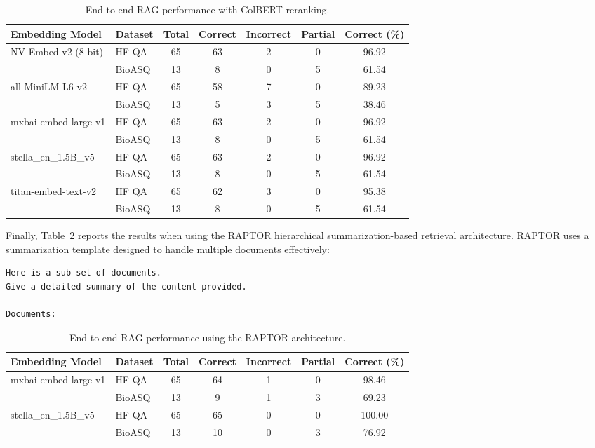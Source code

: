 \documentclass[pdflatex,sn-mathphys-num]{sn-jnl}%
\theoremstyle{thmstyleone}%
\theoremstyle{thmstyletwo}%
\theoremstyle{thmstylethree}%
\begin{document}
\begin{table}[h]
\centering
\small
\begin{tabular}{l l c c c c c}
\hline
\textbf{Embedding Model} & \textbf{Dataset} & \textbf{Total} & \textbf{Correct} & \textbf{Incorrect} & \textbf{Partial} & \textbf{Correct (\%)} \\
\hline
\multirow{2}{*}{NV-Embed-v2 (8-bit)} 
 & HF QA  & 65 & 63 & 2 & 0 & 96.92 \\
 & BioASQ & 13 & 8  & 0 & 5 & 61.54 \\
\hline
\multirow{2}{*}{all-MiniLM-L6-v2} 
 & HF QA  & 65 & 58 & 7 & 0 & 89.23 \\
 & BioASQ & 13 & 5  & 3 & 5 & 38.46 \\
\hline
\multirow{2}{*}{mxbai-embed-large-v1} 
 & HF QA  & 65 & 63 & 2 & 0 & 96.92 \\
 & BioASQ & 13 & 8  & 0 & 5 & 61.54 \\
\hline
\multirow{2}{*}{stella\_en\_1.5B\_v5} 
 & HF QA  & 65 & 63 & 2 & 0 & 96.92 \\
 & BioASQ & 13 & 8  & 0 & 5 & 61.54 \\
\hline
\multirow{2}{*}{titan-embed-text-v2} 
 & HF QA  & 65 & 62 & 3 & 0 & 95.38 \\
 & BioASQ & 13 & 8  & 0 & 5 & 61.54 \\
\hline
\end{tabular}
\caption{End-to-end RAG performance with ColBERT reranking.}
\label{table:rag_eval_rerank}
\end{table}

Finally, Table~\ref{table:rag_eval_raptor} reports the results when using the RAPTOR hierarchical summarization-based retrieval architecture. RAPTOR uses a summarization template designed to handle multiple documents effectively:

\begin{verbatim}
Here is a sub-set of documents. 
Give a detailed summary of the content provided.

Documents:
\end{verbatim}


\begin{table}[h]
\centering
\small
\begin{tabular}{l l c c c c c}
\hline
\textbf{Embedding Model} & \textbf{Dataset} & \textbf{Total} & \textbf{Correct} & \textbf{Incorrect} & \textbf{Partial} & \textbf{Correct (\%)} \\
\hline
\multirow{2}{*}{mxbai-embed-large-v1} 
 & HF QA  & 65 & 64 & 1 & 0 & 98.46 \\
 & BioASQ & 13 & 9  & 1 & 3 & 69.23 \\
\hline
\multirow{2}{*}{stella\_en\_1.5B\_v5} 
 & HF QA  & 65 & 65 & 0 & 0 & 100.00 \\
 & BioASQ & 13 & 10 & 0 & 3 & 76.92 \\
\hline
\end{tabular}
\caption{End-to-end RAG performance using the RAPTOR architecture.}
\label{table:rag_eval_raptor}
\end{table}
\end{document}
